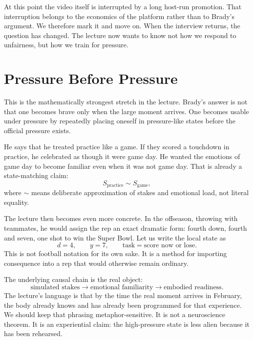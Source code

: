 At this point the video itself is interrupted by a long host-run promotion. That interruption belongs to the economics of the platform rather than to Brady's argument. We therefore mark it and move on. When the interview returns, the question has changed. The lecture now wants to know not how we respond to unfairness, but how we train for pressure.

\section{Pressure Before Pressure}

This is the mathematically strongest stretch in the lecture. Brady's answer is not that one becomes brave only when the large moment arrives. One becomes usable under pressure by repeatedly placing oneself in pressure-like states before the official pressure exists.

He says that he treated practice like a game. If they scored a touchdown in practice, he celebrated as though it were game day. He wanted the emotions of game day to become familiar even when it was not game day. That is already a state-matching claim:
\begin{equation}
S_{\text{practice}} \sim S_{\text{game}},
\end{equation}
where \(\sim\) means deliberate approximation of stakes and emotional load, not literal equality.

The lecture then becomes even more concrete. In the offseason, throwing with teammates, he would assign the rep an exact dramatic form: fourth down, fourth and seven, one shot to win the Super Bowl. Let us write the local state as
\begin{equation}
d = 4,
\qquad
y = 7,
\qquad
\text{task} = \text{score now or lose}.
\end{equation}
This is not football notation for its own sake. It is a method for importing consequence into a rep that would otherwise remain ordinary.

The underlying causal chain is the real object:
\begin{equation}
\text{simulated stakes}
\to
\text{emotional familiarity}
\to
\text{embodied readiness}.
\end{equation}
The lecture's language is that by the time the real moment arrives in February, the body already knows and has already been programmed for that experience. We should keep that phrasing metaphor-sensitive. It is not a neuroscience theorem. It is an experiential claim: the high-pressure state is less alien because it has been rehearsed.

